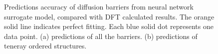 \begingroup
\begin{figure}[!ht]
  \centering
\caption[Predictions accuracy of diffusion barriers from neural network surrogate model, compared with DFT calculated results.]{Predictions accuracy of diffusion barriers from neural network surrogate model, compared with DFT calculated results. The orange solid line indicates perfect fitting. Each blue solid dot represents one data point. (a) predictions of all the barriers. (b) predictions of teneray ordered structures.}
\label{Chap:Al/Vac:fig:fitting_all}
\end{figure}
\endgroup

